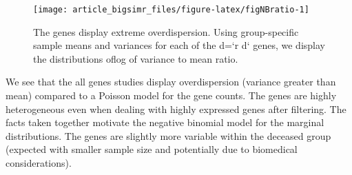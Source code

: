 \documentclass[
]{article}
\newenvironment{Shaded}{\begin{snugshade}}{\end{snugshade}}
\newcommand{\CommentTok}[1]{\textcolor[rgb]{0.56,0.35,0.01}{\textit{#1}}}
\newcommand{\ControlFlowTok}[1]{\textcolor[rgb]{0.13,0.29,0.53}{\textbf{#1}}}
\newcommand{\DataTypeTok}[1]{\textcolor[rgb]{0.13,0.29,0.53}{#1}}
\newcommand{\DecValTok}[1]{\textcolor[rgb]{0.00,0.00,0.81}{#1}}
\newcommand{\KeywordTok}[1]{\textcolor[rgb]{0.13,0.29,0.53}{\textbf{#1}}}
\newcommand{\NormalTok}[1]{#1}
\newcommand{\OperatorTok}[1]{\textcolor[rgb]{0.81,0.36,0.00}{\textbf{#1}}}
\newcommand{\StringTok}[1]{\textcolor[rgb]{0.31,0.60,0.02}{#1}}
\begin{document}
\begin{Shaded}
\end{Shaded}

\begin{figure}

{\centering \texttt{[image: article\_bigsimr\_files/figure-latex/figNBratio-1]} 

}

\caption{The genes display extreme overdispersion. Using group-specific sample means and variances for each of the d=`r d` genes, we display the distributions oflog of variance to mean ratio.}\label{fig:figNBratio}
\end{figure}

We see that the all genes studies display overdispersion (variance greater than mean) compared to a Poisson model for the gene counts. The genes are highly heterogeneous even when dealing with highly expressed genes after filtering. The facts taken together motivate the negative binomial model for the marginal distributions. The genes are slightly more variable within the deceased group (expected with smaller sample size and potentially due to biomedical considerations).
\end{document}
